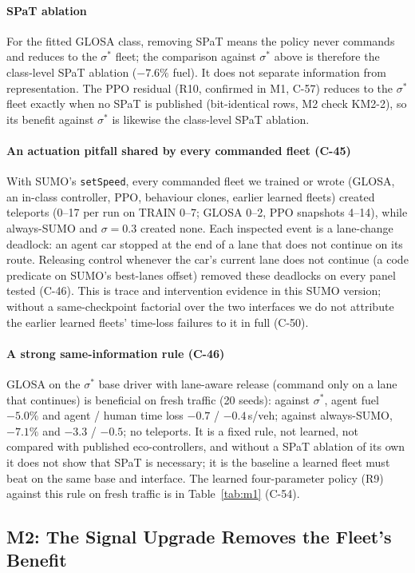 \paragraph{SPaT ablation} For the fitted GLOSA class, removing SPaT means the policy never commands and reduces to the
$\sigma^*$ fleet; the comparison against $\sigma^*$ above is therefore the class-level SPaT ablation ($-7.6\%$ fuel). It does not separate
information from representation. The PPO residual (R10, confirmed in M1, C-57) reduces to the $\sigma^*$ fleet exactly when no SPaT is
published (bit-identical rows, M2 check KM2-2), so its benefit against $\sigma^*$ is likewise the class-level SPaT ablation.
\paragraph{An actuation pitfall shared by every commanded fleet (C-45)} With SUMO's \texttt{setSpeed}, every commanded fleet we
trained or wrote (GLOSA, an in-class controller, PPO, behaviour clones, earlier learned fleets) created teleports (0--17 per run on TRAIN 0--7;
GLOSA 0--2, PPO snapshots 4--14), while always-SUMO and $\sigma=0.3$ created none. Each inspected event is a lane-change deadlock: an agent car stopped at the end of a lane that does
not continue on its route. Releasing control whenever the car's current lane does not continue (a code predicate on SUMO's best-lanes
offset) removed these deadlocks on every panel tested (C-46). This is trace and intervention evidence in this SUMO version; without a
same-checkpoint factorial over the two interfaces we do not attribute the earlier learned fleets' time-loss failures to it in full (C-50).
\paragraph{A strong same-information rule (C-46)} GLOSA on the $\sigma^*$ base driver with lane-aware release (command only on a lane
that continues) is beneficial on fresh traffic (20 seeds): against $\sigma^*$, agent fuel $-5.0\%$ and agent / human time loss $-0.7$ /
$-0.4$\,s/veh; against always-SUMO, $-7.1\%$ and $-3.3$ / $-0.5$; no teleports. It is a fixed rule, not learned, not compared with
published eco-controllers, and without a SPaT ablation of its own it does not show that SPaT is necessary; it is the baseline a learned
fleet must beat on the same base and interface.
The learned four-parameter policy (R9) against this rule on fresh traffic is in Table~\ref{tab:m1} (C-54).

\subsection{M2: The Signal Upgrade Removes the Fleet's Benefit}\label{sec:m2}
